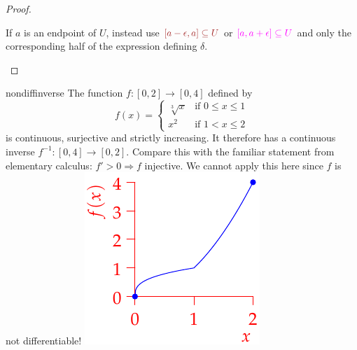 \begin{proof}
\begin{enumerate}
\begin{enumerate}
\begin{minipage}[t]{0.31\linewidth}
			\end{minipage}\medbreak
			
			If $a$ is an endpoint of $U$, instead use $\textcolor{Brown}{[a-\epsilon,a]\subseteq U}$ or $\textcolor{Magenta}{[a,a+\epsilon]\subseteq U}$ and only the corresponding half of the expression defining $\delta$.\qedhere
	  \end{enumerate}
	\end{enumerate}
\end{proof}


\goodbreak


\begin{example}[lower separated=false, sidebyside, sidebyside align=top seam, sidebyside gap=0pt, righthand width=0.27\linewidth]{}{nondiffinverse}
	The function $f:[0,2]\to[0,4]$ defined by
	\[
		f(x)=
		\begin{cases}
			\sqrt[3]{x}&\text{if }0\le x\le 1\\
			x^2&\text{if }1<x\le 2
		\end{cases}
	\]
	is continuous, surjective and strictly increasing. It therefore has a continuous inverse $f^{-1}:[0,4]\to[0,2]$. Compare this with the familiar statement from elementary calculus: $f'>0\Longrightarrow f$ injective. We cannot apply this here since $f$ is not differentiable!
	\tcblower
	\flushright\includegraphics[scale=0.95]{inversecont}
\end{example}


